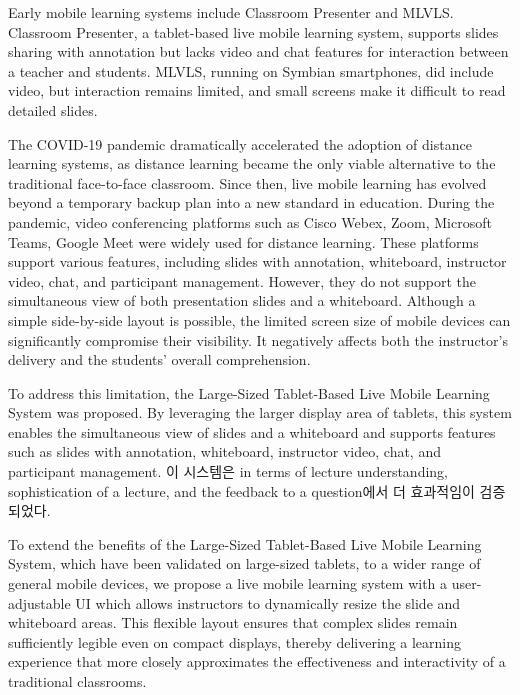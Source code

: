 \documentclass[runningheads]{llncs}
\begin{document}
Early mobile learning systems include Classroom Presenter\cite{ClassroomPresenter} and MLVLS\cite{MLVLS}. Classroom Presenter, a tablet-based live mobile learning system, supports slides sharing with annotation but lacks video and chat features for interaction between a teacher and students. MLVLS, running on Symbian smartphones, did include video, but interaction remains limited, and small screens make it difficult to read detailed slides.

The COVID-19 pandemic dramatically accelerated the adoption of distance learning systems, as distance learning became the only viable alternative to the traditional face-to-face classroom. Since then, live mobile learning has evolved beyond a temporary backup plan into a new standard in education. During the pandemic, video conferencing platforms such as Cisco Webex\cite{Webex}, Zoom\cite{Zoom}, Microsoft Teams\cite{MicrosoftTeams}, Google Meet\cite{GoogleMeet} were widely used for distance learning. These platforms support various features, including slides with annotation, whiteboard, instructor video, chat, and participant management. However, they do not support the simultaneous view of both presentation slides and a whiteboard. Although a simple side-by-side layout is possible, the limited screen size of mobile devices can significantly compromise their visibility. It negatively affects both the instructor's delivery and the students' overall comprehension.

To address this limitation, the Large-Sized Tablet-Based Live Mobile Learning System\cite{10.1007/978-3-030-88207-5_24} was proposed. By leveraging the larger display area of tablets, this system enables the simultaneous view of slides and a whiteboard and supports features such as slides with annotation, whiteboard, instructor video, chat, and participant management. 이 시스템은 in terms of lecture understanding, sophistication of a lecture, and the feedback to a question에서 더 효과적임이 검증되었다.

To extend the benefits of the Large-Sized Tablet-Based Live Mobile Learning System, which have been validated on large-sized tablets, to a wider range of general mobile devices, we propose a live mobile learning system with a user-adjustable UI which allows instructors to dynamically resize the slide and whiteboard areas. This flexible layout ensures that complex slides remain sufficiently legible even on compact displays, thereby delivering a learning experience that more closely approximates the effectiveness and interactivity of  a traditional classrooms.
\end{document}
